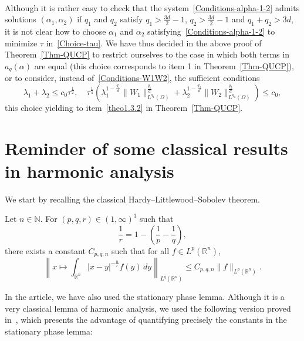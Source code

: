 \documentclass[AHL,Unicode,longabstracts]{cedram}
\newcommand*\R{\mathbb{R}}
\newcommand*\N{\mathbb{N}}
\newcommand*\ds{\displaystyle}
\renewcommand{\leq}{\leqslant}
\begin{document}
\begin{rema}
\begin{align*}
\end{align*}
Although it is rather easy to check that the system~\eqref{Conditions-alpha-1-2} admits solutions $(\alpha_1, \alpha_2)$ if $q_1$ and $q_2$ satisfy $q_1 > \frac{3d}{2} - 1$, $q_2 > \frac{3d}{2} - 1$ and $q_1 + q_2 > 3d$, it is not clear how to choose $\alpha_1$ and $\alpha_2$ satisfying~\eqref{Conditions-alpha-1-2} to minimize $\tau$ in~\eqref{Choice-tau}. We have thus decided in the above proof of Theorem~\ref{Thm-QUCP} to restrict ourselves to the case in which both terms in $a_q(\alpha)$ are equal (this choice corresponds to item 1 in Theorem~\ref{Thm-QUCP}), or to consider, instead of~\eqref{Conditions-W1W2}, the sufficient conditions
\begin{equation*}
\ds
\lambda_1 + \lambda_2 \leq c_0 \tau^{\frac{1}{2}}, \quad
\tau^{\frac{1}{4}} \left(\lambda_1^{1- \frac{q_1}{d}} \| W_{1} \|_{L^{q_1}(\Omega)}^{ \frac{q_1}{d}} + \lambda_2^{1- \frac{q_2}{d}} \| W_{2} \|_{L^{q_2}(\Omega)}^{ \frac{q_2}{d}}\right) \leq c_0,
\end{equation*}
this choice yielding to item~\eqref{theo1.3.2} in Theorem~\ref{Thm-QUCP}.
\end{rema}



\appendix
\section{Reminder of some classical results in harmonic analysis}

We start by recalling the classical Hardy--Littlewood--Sobolev theorem.

\begin{theo}\label{Thm-Hardy-Littlewood-Sobolev}
Let $n \in \N$. For $(p,q,r) \in (1, \infty)^3$ such that
\[
\frac{1}{r}=1-\left(\frac{1}{p}-\frac{1}{q}\right),
\]
there exists a constant $C_{p,q,n}$ such that for all $f \in L^p(\R^n)$,
\[
\left\| x\mapsto \int_{\R^n}|x-y|^{- \frac{n}{r} } f(y)\, d y
\right\|_{L^q(\R^n)}
\leq C_{p, q,n}
\|f\|_{L^p(\R^n)}.
\]
\end{theo}

In the article, we have also used the stationary phase lemma. Although it is a very classical lemma of harmonic analysis, we used the following version proved in~\cite{alazard2017stationary}, which presents the advantage of quantifying precisely the constants in the stationary phase lemma:
\end{document}
